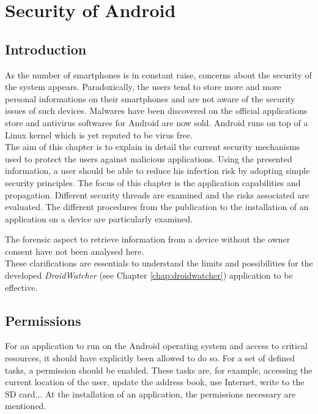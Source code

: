 \chapter{Security of Android}
\label{chap:and-secu}

\section*{Introduction}
As the number of smartphones is in constant raise, concerns about the security of the system appears.
Paradoxically, the users tend to store more and more personal informations on their smartphones and are not aware of the security issues of such devices.
Malwares have been discovered on the official applications store and antivirus softwares for Android are now sold.
Android runs on top of a Linux kernel which is yet reputed to be virus free.\\

The aim of this chapter is to explain in detail the current security mechanisms used to protect the users against malicious applications.
Using the presented information, a user should be able to reduce his infection risk by adopting simple security principles.
The focus of this chapter is the application capabilities and propagation.
Different security threads are examined and the risks associated are evaluated.
The different procedures from the publication to the installation of an application on a device are particularly examined.

The forensic aspect to retrieve information from a device without the owner consent have not been analysed here.\\

These clarifications are essentials to understand the limits and possibilities for the developed \emph{DroidWatcher} (see Chapter \ref{chap:droidwatcher}) application to be effective.

\section{Permissions}
For an application to run on the Android operating system and access to critical resources, it should have explicitly been allowed to do so.
For a set of defined tasks, a permission should be enabled.
These tasks are, for example, accessing the current location of the user, update the address book, use Internet, write to the SD card...
At the installation of an application, the permissions necessary are mentioned.\\

